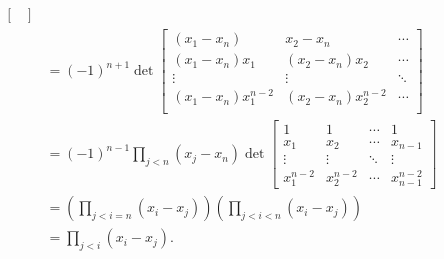 \begin{solution}
\begin{itemize}
\begin{align*}
\begin{bmatrix}
        \end{bmatrix}\\
        & =
        (-1)^{n+1}
        \det
        \begin{bmatrix}
          (x_1-x_n) & x_2-x_n & \cdots\\%
          (x_1-x_n)x_1 & (x_2-x_n)x_2 & \cdots\\%
          \vdots & \vdots & \ddots\\%
          (x_1-x_n)x_1^{n-2} & (x_2-x_n)x_2^{n-2} & \cdots\\%
        \end{bmatrix}\\
        & =
        (-1)^{n-1} \prod_{j < n} (x_j - x_n)
        \det
        \begin{bmatrix}
          1 & 1 & \cdots & 1\\
          x_1 & x_2 & \cdots & x_{n-1}\\
          \vdots & \vdots & \ddots & \vdots\\
          x_1^{n-2} & x_2^{n-2} & \cdots & x_{n-1}^{n-2}
        \end{bmatrix}\\
        & =
        \left(\prod_{j < i = n} (x_i - x_j)\right)
        \left(\prod_{j < i < n} (x_i - x_j)\right)\\
        &= \prod_{j < i} (x_i - x_j).
      \end{align*}
  \end{itemize}
\end{solution}


